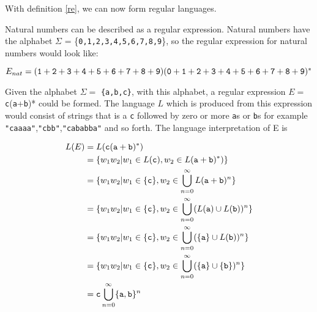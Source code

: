With definition \ref{re}, we can now form regular languages. 
\begin{myex}Natural numbers can be described as a regular expression. Natural numbers have the alphabet $\Sigma$ = \{{\tt 0,1,2,3,4,5,6,7,8,9}\}, so the regular expression for natural numbers would look like:
\begin{center}
$E_{nat} = ({\tt 1}+{\tt 2}+{\tt 3}+{\tt 4}+{\tt 5}+{\tt 6}+{\tt 7}+{\tt 8}+{\tt 9})({\tt 0}+{\tt 1}+{\tt 2}+{\tt 3}+{\tt 4}+{\tt 5}+{\tt 6}+{\tt 7}+{\tt 8}+{\tt 9})^*$
\end{center}
\end{myex}
\newpage
\begin{myex}
Given the alphabet $\Sigma =$ {\tt\{a,b,c\}}, with this alphabet, a regular expression $E =$ {\tt c}({\tt a}+{\tt b})* could be formed. The language $L$ which is produced from this expression would consist of strings that is a {\tt c} followed by zero or more {\tt a}s or {\tt b}s for example {\tt "caaaa"},{\tt "cbb"},{\tt "cababba"} and so forth. The language interpretation of E is 
\begin{center}
\begin{align*}
L(E) &= L({\tt c}({\tt a}+{\tt b})^*)\\
	 &= \{w_1 w_2|w_1 \in L({\tt c}),w_2 \in L({\tt a}+{\tt b})^*)\}\\
	 &= \{w_1 w_2|w_1 \in \{{\tt c}\}, w_2 \in \bigcup\limits_{n=0}^\infty L({\tt a}+{\tt b})^n \}\\
	 &= \{w_1 w_2|w_1 \in \{{\tt c}\}, w_2 \in \bigcup\limits_{n=0}^\infty (L({\tt a}) \cup L({\tt b}))^n \}\\
	 &= \{w_1 w_2|w_1 \in \{{\tt c}\}, w_2 \in \bigcup\limits_{n=0}^\infty (\{{\tt a}\} \cup L({\tt b}))^n \}\\
	 &= \{w_1 w_2|w_1 \in \{{\tt c}\}, w_2 \in \bigcup\limits_{n=0}^\infty (\{{\tt a}\} \cup \{{\tt b}\})^n \}\\
	 &= {\tt c} \bigcup\limits_{n=0}^\infty \{{\tt a,b}\}^n 
\end{align*}
\end{center}
\label{reinter}
\end{myex}